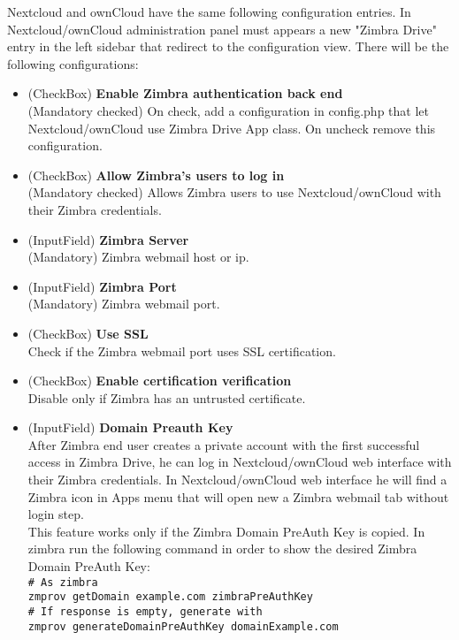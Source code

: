     Nextcloud and ownCloud have the same following configuration entries.
    In Nextcloud/ownCloud administration panel must appears a new "Zimbra Drive" entry in the left sidebar
    that redirect to the configuration view. There will be the following configurations:
    \begin{itemize}
        \item (CheckBox) \textbf{Enable Zimbra authentication back end}\\
        (Mandatory checked) On check, add a configuration in config.php that let Nextcloud/ownCloud use Zimbra Drive App class. On uncheck remove this configuration.
        \item (CheckBox) \textbf{Allow Zimbra's users to log in}\\
        (Mandatory checked) Allows Zimbra users to use Nextcloud/ownCloud with their Zimbra credentials.
        \item (InputField) \textbf{Zimbra Server}\\
        (Mandatory) Zimbra webmail host or ip.
        \item (InputField) \textbf{Zimbra Port}\\
        (Mandatory) Zimbra webmail port.
        \item (CheckBox) \textbf{Use SSL}\\
        Check if the Zimbra webmail port uses SSL certification.
        \item (CheckBox) \textbf{Enable certification verification}\\
        Disable only if Zimbra has an untrusted certificate.
        \item (InputField) \textbf{Domain Preauth Key}\\
        After Zimbra end user creates a private account with the first successful access in Zimbra Drive,
        he can log in Nextcloud/ownCloud web interface with their Zimbra credentials. 
        In Nextcloud/ownCloud web interface he will find a Zimbra icon in Apps menu
        that will open new a Zimbra webmail tab without login step.\\
        This feature works only if the Zimbra Domain PreAuth Key is copied. 
        In zimbra run the following command in order to show the desired Zimbra Domain PreAuth Key:\\
        \texttt{\# As zimbra}\\
        \texttt{zmprov getDomain example.com zimbraPreAuthKey}\\
        \texttt{\# If response is empty, generate with}\\
        \texttt{zmprov generateDomainPreAuthKey domainExample.com}\\
    \end{itemize}

